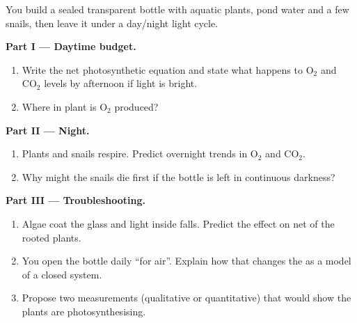 \begin{problem}
\label{pb:g10:photosynthesis:1}
You build a sealed transparent bottle with aquatic plants, pond water
and a few snails, then leave it under a day/night light cycle.

\medskip
\noindent\textbf{Part I --- Daytime budget.}
\begin{enumerate}
  \item Write the net photosynthetic equation and state what happens to
        $\mathrm{O_2}$ and $\mathrm{CO_2}$ levels by afternoon if light
        is bright.
  \item Where in plant  is $\mathrm{O_2}$ produced?
\end{enumerate}

\medskip
\noindent\textbf{Part II --- Night.}
\begin{enumerate}
  \item Plants and snails respire. Predict overnight trends in
        $\mathrm{O_2}$ and $\mathrm{CO_2}$.
  \item Why might the snails die first if the bottle is left in continuous
        darkness?
\end{enumerate}

\medskip
\noindent\textbf{Part III --- Troubleshooting.}
\begin{enumerate}
  \item Algae coat the glass and light inside falls. Predict the effect
        on net  of the rooted plants.
  \item You open the bottle daily ``for air''. Explain how that changes
        the  as a model of a closed system.
  \item Propose two measurements (qualitative or quantitative) that would
        show the plants are photosynthesising.
\end{enumerate}
\end{problem}
